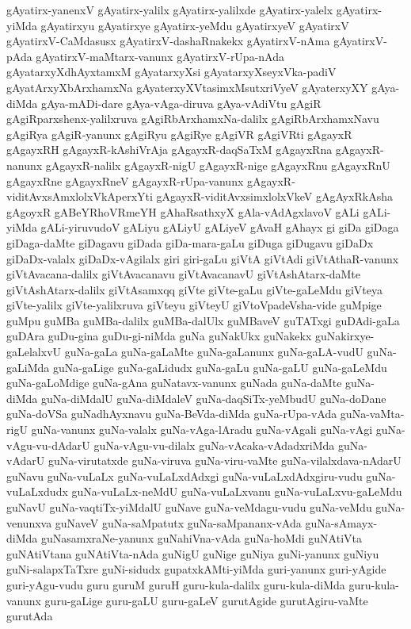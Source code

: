 {gAyatirx-yanenxV
gAyatirx-yalilx
gAyatirx-yalilxde
gAyatirx-yalelx
gAyatirx-yiMda
gAyatirxyu
gAyatirxye
gAyatirx-yeMdu
gAyatirxyeV
gAyatirxV
gAyatirxV-CaMdasusx
gAyatirxV-dashaRnakekx
gAyatirxV-nAma
gAyatirxV-pAda
gAyatirxV-maMtarx-vanunx
gAyatirxV-rUpa-nAda
gAyatarxyXdhAyxtamxM
gAyatarxyXsi
gAyatarxyXseyxVka-padiV
gAyatArxyXbArxhamxNa
gAyaterxyXVtasimxMsutxriVyeV
gAyaterxyXY
gAya-diMda
gAya-mADi-dare
gAya-vAga-diruva
gAya-vAdiVtu
gAgiR
gAgiRparxshenx-yalilxruva
gAgiRbArxhamxNa-dalilx
gAgiRbArxhamxNavu
gAgiRya
gAgiR-yanunx
gAgiRyu
gAgiRye
gAgiVR
gAgiVRti
gAgayxR
gAgayxRH
gAgayxR-kAshiVrAja
gAgayxR-daqSaTxM
gAgayxRna
gAgayxR-nanunx
gAgayxR-nalilx
gAgayxR-nigU
gAgayxR-nige
gAgayxRnu
gAgayxRnU
gAgayxRne
gAgayxRneV
gAgayxR-rUpa-vanunx
gAgayxR-viditAvxsAmxlolxVkAperxYti
gAgayxR-viditAvxsimxlolxVkeV
gAgAyxRkAsha
gAgoyxR
gABeYRhoVRmeYH
gAhaRsathxyX
gAla-vAdAgxlavoV
gALi
gALi-yiMda
gALi-yiruvudoV
gALiyu
gALiyU
gALiyeV
gAvaH
gAhayx
gi
giDa
giDaga
giDaga-daMte
giDagavu
giDada
giDa-mara-gaLu
giDuga
giDugavu
giDaDx
giDaDx-valalx
giDaDx-vAgilalx
giri
giri-gaLu
giVtA
giVtAdi
giVtAthaR-vanunx
giVtAvacana-dalilx
giVtAvacanavu
giVtAvacanavU
giVtAshAtarx-daMte
giVtAshAtarx-dalilx
giVtAsamxqq
giVte
giVte-gaLu
giVte-gaLeMdu
giVteya
giVte-yalilx
giVte-yalilxruva
giVteyu
giVteyU
giVtoVpadeVsha-vide
guMpige
guMpu
guMBa
guMBa-dalilx
guMBa-dalUlx
guMBaveV
guTATxgi
guDAdi-gaLa
guDAra
guDu-gina
guDu-gi-niMda
guNa
guNakUkx
guNakekx
guNakirxye-gaLelalxvU
guNa-gaLa
guNa-gaLaMte
guNa-gaLanunx
guNa-gaLA-vudU
guNa-gaLiMda
guNa-gaLige
guNa-gaLidudx
guNa-gaLu
guNa-gaLU
guNa-gaLeMdu
guNa-gaLoMdige
guNa-gAna
guNatavx-vanunx
guNada
guNa-daMte
guNa-diMda
guNa-diMdalU
guNa-diMdaleV
guNa-daqSiTx-yeMbudU
guNa-doDane
guNa-doVSa
guNadhAyxnavu
guNa-BeVda-diMda
guNa-rUpa-vAda
guNa-vaMta-rigU
guNa-vanunx
guNa-valalx
guNa-vAga-lAradu
guNa-vAgali
guNa-vAgi
guNa-vAgu-vu-dAdarU
guNa-vAgu-vu-dilalx
guNa-vAcaka-vAdadxriMda
guNa-vAdarU
guNa-virutatxde
guNa-viruva
guNa-viru-vaMte
guNa-vilalxdava-nAdarU
guNavu
guNa-vuLaLx
guNa-vuLaLxdAdxgi
guNa-vuLaLxdAdxgiru-vudu
guNa-vuLaLxdudx
guNa-vuLaLx-neMdU
guNa-vuLaLxvanu
guNa-vuLaLxvu-gaLeMdu
guNavU
guNa-vaqtiTx-yiMdalU
guNave
guNa-veMdagu-vudu
guNa-veMdu
guNa-venunxva
guNaveV
guNa-saMpatutx
guNa-saMpananx-vAda
guNa-sAmayx-diMda
guNasamxraNe-yanunx
guNahiVna-vAda
guNa-hoMdi
guNAtiVta
guNAtiVtana
guNAtiVta-nAda
guNigU
guNige
guNiya
guNi-yanunx
guNiyu
guNi-salapxTaTxre
guNi-sidudx
gupatxkAMti-yiMda
guri-yanunx
guri-yAgide
guri-yAgu-vudu
guru
guruM
guruH
guru-kula-dalilx
guru-kula-diMda
guru-kula-vanunx
guru-gaLige
guru-gaLU
guru-gaLeV
gurutAgide
gurutAgiru-vaMte
gurutAda
}
